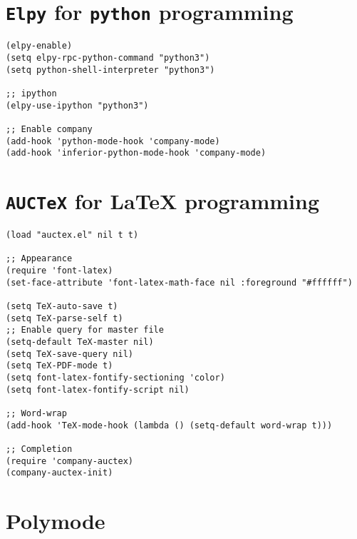 \documentclass[11pt]{article}
\begin{document}
\section{\texttt{Elpy} for \texttt{python} programming}
\label{sec:org4d9d70e}

\begin{verbatim}
(elpy-enable)				
(setq elpy-rpc-python-command "python3")
(setq python-shell-interpreter "python3")

;; ipython
(elpy-use-ipython "python3")

;; Enable company
(add-hook 'python-mode-hook 'company-mode)
(add-hook 'inferior-python-mode-hook 'company-mode)
\end{verbatim}

\section{\texttt{AUCTeX} for \LaTeX{} programming}
\label{sec:orgc235fbe}
\begin{verbatim}
(load "auctex.el" nil t t)

;; Appearance
(require 'font-latex)
(set-face-attribute 'font-latex-math-face nil :foreground "#ffffff")

(setq TeX-auto-save t)			    
(setq TeX-parse-self t)
;; Enable query for master file
(setq-default TeX-master nil)		    
(setq TeX-save-query nil)		    
(setq TeX-PDF-mode t)			    
(setq font-latex-fontify-sectioning 'color) 
(setq font-latex-fontify-script nil)	    

;; Word-wrap
(add-hook 'TeX-mode-hook (lambda () (setq-default word-wrap t)))

;; Completion
(require 'company-auctex)
(company-auctex-init)

\end{verbatim}

\section{Polymode}
\label{sec:org43a5ee7}
\end{document}
